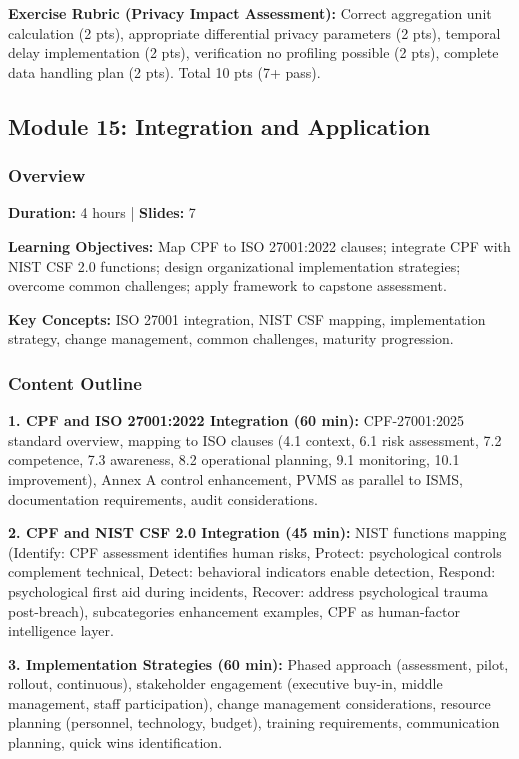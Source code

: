\documentclass[11pt,a4paper]{article}
\begin{document}
\textbf{Exercise Rubric (Privacy Impact Assessment):} Correct aggregation unit calculation (2 pts), appropriate differential privacy parameters (2 pts), temporal delay implementation (2 pts), verification no profiling possible (2 pts), complete data handling plan (2 pts). Total 10 pts (7+ pass).

\subsection{Module 15: Integration and Application}

\subsubsection{Overview}
\textbf{Duration:} 4 hours | \textbf{Slides:} 7

\textbf{Learning Objectives:} Map CPF to ISO 27001:2022 clauses; integrate CPF with NIST CSF 2.0 functions; design organizational implementation strategies; overcome common challenges; apply framework to capstone assessment.

\textbf{Key Concepts:} ISO 27001 integration, NIST CSF mapping, implementation strategy, change management, common challenges, maturity progression.

\subsubsection{Content Outline}
\textbf{1. CPF and ISO 27001:2022 Integration (60 min):} CPF-27001:2025 standard overview, mapping to ISO clauses (4.1 context, 6.1 risk assessment, 7.2 competence, 7.3 awareness, 8.2 operational planning, 9.1 monitoring, 10.1 improvement), Annex A control enhancement, PVMS as parallel to ISMS, documentation requirements, audit considerations.

\textbf{2. CPF and NIST CSF 2.0 Integration (45 min):} NIST functions mapping (Identify: CPF assessment identifies human risks, Protect: psychological controls complement technical, Detect: behavioral indicators enable detection, Respond: psychological first aid during incidents, Recover: address psychological trauma post-breach), subcategories enhancement examples, CPF as human-factor intelligence layer.

\textbf{3. Implementation Strategies (60 min):} Phased approach (assessment, pilot, rollout, continuous), stakeholder engagement (executive buy-in, middle management, staff participation), change management considerations, resource planning (personnel, technology, budget), training requirements, communication planning, quick wins identification.
\end{document}
